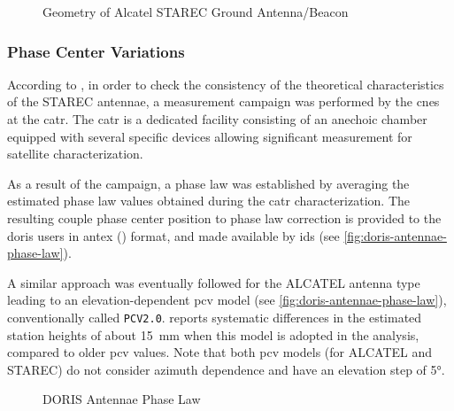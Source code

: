 \begin{figure}
  \centering
  
  \caption{Geometry of Alcatel STAREC Ground Antenna/Beacon}
  \label{fig:starec-antenna}
\end{figure}

\subsubsection{Phase Center Variations}\label{sssec:doris-pcv}
According to \cite{Tourain2016}, in order to check the consistency of the theoretical 
characteristics of the STAREC antennae, a measurement campaign was performed by 
the \gls{cnes} at the \gls{catr}. The \gls{catr} is a dedicated facility 
consisting of an anechoic chamber equipped with several specific devices 
allowing significant measurement for satellite characterization.

As a result of the campaign, a phase law was established by averaging the 
estimated phase law values obtained during the \gls{catr} characterization. 
The resulting couple phase center position to phase law correction is provided 
to the \gls{doris} users in \gls{antex} (\cite{ANTEXv14}) format, and 
made available by \gls{ids} (see \autoref{fig:doris-antennae-phase-law}).

A similar approach was eventually followed for the ALCATEL antenna type 
leading to an elevation-dependent \gls{pcv} model (see \autoref{fig:doris-antennae-phase-law}), 
conventionally called \texttt{PCV2.0}. \cite{Stepanek2022b} reports systematic differences in 
the estimated station heights of about \SI{15}{\milli\meter} when this model is 
adopted in the analysis, compared to older \gls{pcv} values. Note that both 
\gls{pcv} models (for ALCATEL and STAREC) do not consider azimuth dependence 
and have an elevation step of \ang{5}.

\begin{figure}
  \centering
  
  \caption{DORIS Antennae Phase Law}
  \label{fig:doris-antennae-phase-law}
\end{figure}
